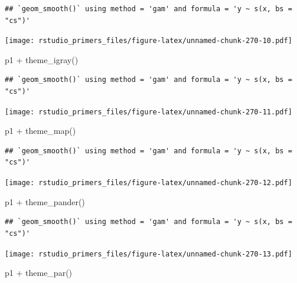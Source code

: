 \documentclass[
]{article}
\newenvironment{Shaded}{\begin{snugshade}}{\end{snugshade}}
\newcommand{\FunctionTok}[1]{\textcolor[rgb]{0.00,0.00,0.00}{#1}}
\newcommand{\NormalTok}[1]{#1}
\newcommand{\SpecialCharTok}[1]{\textcolor[rgb]{0.00,0.00,0.00}{#1}}
\begin{document}
\begin{verbatim}
## `geom_smooth()` using method = 'gam' and formula = 'y ~ s(x, bs = "cs")'
\end{verbatim}

\texttt{[image: rstudio\_primers\_files/figure-latex/unnamed-chunk-270-10.pdf]}

\begin{Shaded}
\begin{Highlighting}[]
\NormalTok{p1 }\SpecialCharTok{+} \FunctionTok{theme\_igray}\NormalTok{()}
\end{Highlighting}
\end{Shaded}

\begin{verbatim}
## `geom_smooth()` using method = 'gam' and formula = 'y ~ s(x, bs = "cs")'
\end{verbatim}

\texttt{[image: rstudio\_primers\_files/figure-latex/unnamed-chunk-270-11.pdf]}

\begin{Shaded}
\begin{Highlighting}[]
\NormalTok{p1 }\SpecialCharTok{+} \FunctionTok{theme\_map}\NormalTok{()}
\end{Highlighting}
\end{Shaded}

\begin{verbatim}
## `geom_smooth()` using method = 'gam' and formula = 'y ~ s(x, bs = "cs")'
\end{verbatim}

\texttt{[image: rstudio\_primers\_files/figure-latex/unnamed-chunk-270-12.pdf]}

\begin{Shaded}
\begin{Highlighting}[]
\NormalTok{p1 }\SpecialCharTok{+} \FunctionTok{theme\_pander}\NormalTok{()}
\end{Highlighting}
\end{Shaded}

\begin{verbatim}
## `geom_smooth()` using method = 'gam' and formula = 'y ~ s(x, bs = "cs")'
\end{verbatim}

\texttt{[image: rstudio\_primers\_files/figure-latex/unnamed-chunk-270-13.pdf]}

\begin{Shaded}
\begin{Highlighting}[]
\NormalTok{p1 }\SpecialCharTok{+} \FunctionTok{theme\_par}\NormalTok{()}
\end{Highlighting}
\end{Shaded}
\end{document}
